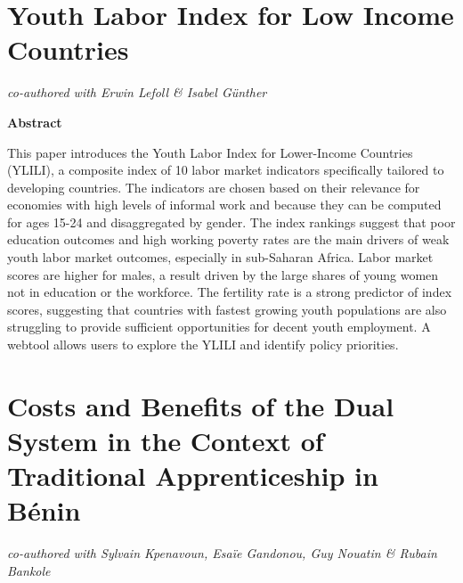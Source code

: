 \documentclass[
  11pt,
a4paper
]{report}
\newcommand{\newsection}{\setcounter{figure}{0}
\renewcommand{\thefigure}{\arabic{chapter}.\arabic{figure}}
\setcounter{table}{0}
\renewcommand{\thetable}{\arabic{chapter}.\arabic{table}}
\normalfont}
\newenvironment{chapabstract}{%
    \begin{center}%
      \bfseries Abstract
    \end{center}}%
   {\par}
\begin{document}
\clearpage

\newsection

\doublespacing

\chapter{Youth Labor Index for Low Income Countries}

\emph{co-authored with Erwin Lefoll \& Isabel Günther}

\begin{chapabstract}
This paper introduces the Youth Labor Index for Lower-Income Countries (YLILI), a composite index of 10 labor market indicators specifically tailored to developing countries. The indicators are chosen based on their relevance for economies with high levels of informal work and because they can be computed for ages 15-24 and disaggregated by gender. The index rankings suggest that poor education outcomes and high working poverty rates are the main drivers of weak youth labor market outcomes, especially in sub-Saharan Africa. Labor market scores are higher for males, a result driven by the large shares of young women not in education or the workforce. The fertility rate is a strong predictor of index scores, suggesting that countries with fastest growing youth populations are also struggling to provide sufficient opportunities for decent youth employment. A webtool allows users to explore the YLILI and identify policy priorities.
\end{chapabstract}

\clearpage

\newsection

\chapter{Costs and Benefits of the Dual System in the Context of Traditional Apprenticeship in Bénin}

\emph{co-authored with Sylvain Kpenavoun, Esaïe Gandonou, Guy Nouatin \& Rubain Bankole}
\end{document}
